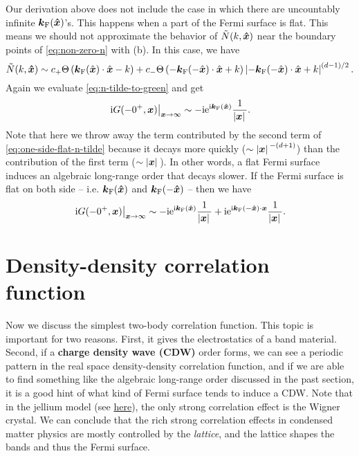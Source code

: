 \documentclass[hyperref, a4paper]{article}
\newcommand*{\ii}{\mathrm{i}}
\newcommand*{\ee}{\mathrm{e}}
\newcommand*{\concept}[1]{{\textbf{#1}}}
\begin{document}
Our derivation above does not include the case in which there are uncountably infinite $\vb*{k}_\text{F}(\vu*{x})$'s.
This happens when a part of the Fermi surface is flat. This means we should not approximate the behavior 
of $\tilde{N}(k, \vu*{x})$ near the boundary points of \eqref{eq:non-zero-n} with (b).
In this case, we have 
\begin{equation}
    \tilde{N}(k, \vu*{x}) \sim c_+ \Theta\left(\boldsymbol{k}_\text{F}(\hat{\boldsymbol{x}}) \cdot \hat{\boldsymbol{x}}-k\right) + c_- \Theta\left(- \boldsymbol{k}_\text{F}(-\hat{\boldsymbol{x}}) \cdot \hat{\boldsymbol{x}}+ k\right) \left|-\boldsymbol{k}_\text{F}(-\hat{\boldsymbol{x}}) \cdot \hat{\boldsymbol{x}}+k\right|^{(d-1) / 2}.
    \label{eq:one-side-flat-n-tilde}
\end{equation}
Again we evaluate \eqref{eq:n-tilde-to-green} and get 
\begin{equation}
    \left.\ii G(-0^+, \vb*{x})\right|_{\vb*{x} \to \infty} \sim - \ii \ee^{\ii \vb*{k}_\text{F}(\vu*{x})} \frac{1}{\abs*{\vb*{x}}}.
\end{equation}
Note that here we throw away the term contributed by the second term of \eqref{eq:one-side-flat-n-tilde}
because it decays more quickly ($\sim \abs*{\vb*{x}}^{-(d+1)}$) than the contribution of the first term 
($\sim \abs*{\vb*{x}}$). In other words, a flat Fermi surface induces an algebraic long-range order that decays slower.
If the Fermi surface is flat on both side -- i.e. $\vb*{k}_\text{F}(\vu*{x})$ and $\vb*{k}_\text{F}(-\vu*{x})$ --
then we have 
\begin{equation}
    \left.\ii G(-0^+, \vb*{x})\right|_{\vb*{x} \to \infty} \sim - \ii \ee^{\ii \vb*{k}_\text{F}(\vu*{x})} \frac{1}{\abs*{\vb*{x}}} + \ii \ee^{\ii \vb*{k}_\text{F}(- \vu*{x}) \cdot \vb*{x}} \frac{1}{\abs*{\vb*{x}}}.
\end{equation}

\section{Density-density correlation function}

Now we discuss the simplest two-body correlation function.  This topic is important for two reasons. 
First, it gives the electrostatics of a band material. Second, if a \concept{charge density wave (CDW)}
order forms, we can see a periodic pattern in the real space density-density correlation function,
and if we are able to find something like the algebraic long-range order discussed in the past section,
it is a good hint of what kind of Fermi surface tends to induce a CDW. Note that in the jellium model 
(see \href{electron-gas.pdf}{here}), the only strong correlation effect is the Wigner crystal. 
We can conclude that the rich strong correlation effects in condensed matter physics are mostly 
controlled by the \emph{lattice}, and the lattice shapes the bands and thus the Fermi surface.
\end{document}
